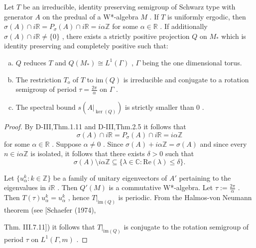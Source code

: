 \begin{proposition}\label{prop:d4-3.10}
Let $ T $  be an irreducible, identity preserving semigroup of Schwarz type with generator $ A $  on the predual of a W*-algebra $ M $ .
If $ T $  is uniformly ergodic, then $ \sigma(A) \cap i\mathbb{R} = P_{\sigma}(A) \cap i\mathbb{R} = i\alpha\mathbb{Z} $  for some $ \alpha \in \mathbb{R} $ .
If additionally $ \sigma(A) \cap i\mathbb{R} \neq \{0\} $ , there exists a strictly positive projection $ Q $  on $ M_{*} $  which is identity preserving and completely positive such that:
\begin{enumerate}[(a)]
\item
$ Q $  reduces $ T $  and $ Q(M_{*}) \cong L^{1}(\Gamma) $ , $ \Gamma $  being the one dimensional torus.

\item
The restriction $ T_{o} $  of $ T $  to $ \text{im}(Q) $  is irreducible and conjugate to a rotation semigroup of period $ \tau = \frac{2\pi}{\alpha} $  on $ \Gamma $ .

\item
The spectral bound $ s(A|_{\ker(Q)}) $  is strictly smaller than $ 0 $ .
\end{enumerate}
\end{proposition}


\begin{proof}
By D-III,Thm.1.11 and D-III,Thm.2.5 it follows that
\[
\sigma(A) \cap i\mathbb{R} = P_{\sigma}(A) \cap i\mathbb{R} = i\alpha\mathbb{Z}
\]
for some $ \alpha \in \mathbb{R} $ .
Suppose $ \alpha \neq 0 $ .
Since $ \sigma(A) + i\alpha\mathbb{Z} = \sigma(A) $  and since every $ n \in i\alpha\mathbb{Z} $  is isolated, it follows that there exists $ \delta > 0 $  such that
\[
\sigma(A) \setminus i\alpha\mathbb{Z} \subseteq \{\lambda \in \mathbb{C}: \text{Re}(\lambda) \leq \delta\}.
\]

Let $ \{u_{\alpha}^{k}: k \in \mathbb{Z}\} $  be a family of unitary eigenvectors of $ A' $  pertaining to the eigenvalues in $ i\mathbb{R} $ .
Then $ Q'(M) $  is a commutative W*-algebra.
Let $ \tau := \frac{2\pi}{\alpha} $ .
Then $ T(\tau)u_{\alpha}^{k} = u_{\alpha}^{k} $ , hence $ T|_{\text{im}(Q)} $  is periodic.
From the Halmos-von Neumann theorem (see [Schaefer (1974),

\newpage

Thm. III.7.11]) it follows that $ T|_{\text{im}(Q)} $  is conjugate to the rotation semigroup of period $ \tau $  on $ L^{1}(\Gamma,m) $ .
\end{proof}

